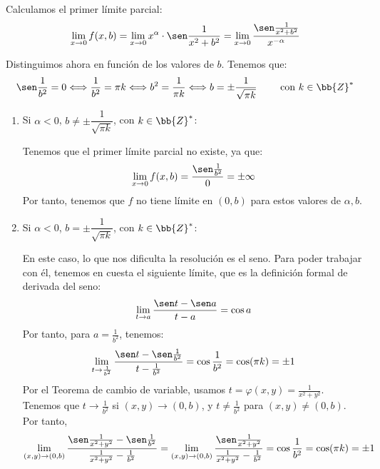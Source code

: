 \begin{ejercicio}
\begin{enumerate}
        Calculamos el primer límite parcial:
        \begin{equation*}
            \lim_{x\to 0}f(x,b)
            = \lim_{x\to 0} x^\alpha \cdot \sen \frac{1}{x^2+b^2}
            = \lim_{x\to 0} \frac{\sen \frac{1}{x^2+b^2}}{x^{-\alpha}}
        \end{equation*}

        Distinguimos ahora en función de los valores de $b$. Tenemos que:
        \begin{equation*}
            \sen \frac{1}{b^2}=0 \Longleftrightarrow \frac{1}{b^2}=\pi k \Longleftrightarrow b^2=\frac{1}{\pi k}\Longleftrightarrow b=\pm \frac{1}{\sqrt{\pi k}}\qquad \text{ con } k\in \bb{Z}^\ast
        \end{equation*}

        \begin{enumerate}
            \item Si $\alpha<0$, $b\neq \pm \dfrac{1}{\sqrt{\pi k}}$, con $k\in \bb{Z}^\ast$:

            Tenemos que el primer límite parcial no existe, ya que:
            \begin{equation*}
                 \lim_{x\to 0}f(x,b) = \frac{\sen \frac{1}{b^2}}{0}=\pm \infty
            \end{equation*}
            Por tanto, tenemos que $f$ no tiene límite en $(0,b)$ para estos valores de $\alpha, b$.

            \item Si $\alpha<0$, $b= \pm \dfrac{1}{\sqrt{\pi k}}$, con $k\in \bb{Z}^\ast$:

            En este caso, lo que nos dificulta la resolución es el seno. Para poder trabajar con él, tenemos en cuesta el siguiente límite, que es la definición formal de derivada del seno:
            \begin{equation*}
                \lim_{t\to a}\frac{\sen t - \sen a}{t-a}=\cos a
            \end{equation*}
            Por tanto, para $a=\frac{1}{b^2}$, tenemos:
            \begin{equation*}
                \lim_{t\to \frac{1}{b^2}}\frac{\sen t - \sen \frac{1}{b^2}}{t-\frac{1}{b^2}}=\cos \frac{1}{b^2} = \cos(\pi k)=\pm 1
            \end{equation*}
            Por el Teorema de cambio de variable, usamos $t=\varphi(x,y)=\frac{1}{x^2+y^2}$. Tenemos que $t\to \frac{1}{b^2}$ si $(x,y)\to (0,b)$, y $t\neq \frac{1}{b^2}$ para $(x,y)\neq (0,b)$. Por tanto, 
            \begin{equation*}
                \lim_{(x,y)\to (0,b)}\frac{\sen\frac{1}{x^2+y^2} - \sen \frac{1}{b^2}}{\frac{1}{x^2+y^2} - \frac{1}{b^2}}
                = \lim_{(x,y)\to (0,b)}\frac{\sen\frac{1}{x^2+y^2}}{\frac{1}{x^2+y^2} - \frac{1}{b^2}}
                =\cos \frac{1}{b^2} = \cos(\pi k)=\pm 1
            \end{equation*}



\end{enumerate}
\end{enumerate}
\end{ejercicio}
